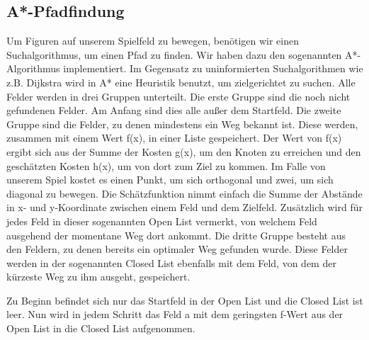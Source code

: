\documentclass[extern,palatino]{cgBA}
\begin{document}
\subsection{A*-Pfadfindung}\label{Pfadfindung}
Um Figuren auf unserem Spielfeld zu bewegen, benötigen wir einen Suchalgorithmus, um einen Pfad zu finden. Wir haben dazu den sogenannten A*-Algorithmus implementiert. Im Gegensatz zu uninformierten Suchalgorithmen wie z.B. Dijkstra wird in A* eine Heuristik benutzt, um zielgerichtet zu suchen. Alle Felder werden in drei Gruppen unterteilt. Die erste Gruppe sind die noch nicht gefundenen Felder. Am Anfang sind dies alle außer dem Startfeld. Die zweite Gruppe sind die Felder, zu denen mindestens ein Weg bekannt ist. Diese werden, zusammen mit einem Wert f(x), in einer Liste gespeichert. Der Wert von f(x) ergibt sich aus der Summe der Kosten g(x), um den Knoten zu erreichen und den geschätzten Kosten h(x), um von dort zum Ziel zu kommen. Im Falle von unserem Spiel kostet es einen Punkt, um sich orthogonal und zwei, um sich diagonal zu bewegen. Die Schätzfunktion nimmt einfach die Summe der Abstände in x- und y-Koordinate zwischen einem Feld und dem Zielfeld. Zusätzlich wird für jedes Feld in dieser sogenannten Open List vermerkt, von welchem Feld ausgehend der momentane Weg dort ankommt. Die dritte Gruppe besteht aus den Feldern, zu denen bereits ein optimaler Weg gefunden wurde. Diese Felder werden in der sogenannten Closed List ebenfalls mit dem Feld, von dem der kürzeste Weg zu ihm ausgeht, gespeichert.
	
Zu Beginn befindet sich nur das Startfeld in der Open List und die Closed List ist leer. Nun wird in jedem Schritt das Feld a mit dem geringsten f-Wert aus der Open List in die Closed List aufgenommen. 
	
\end{document}
